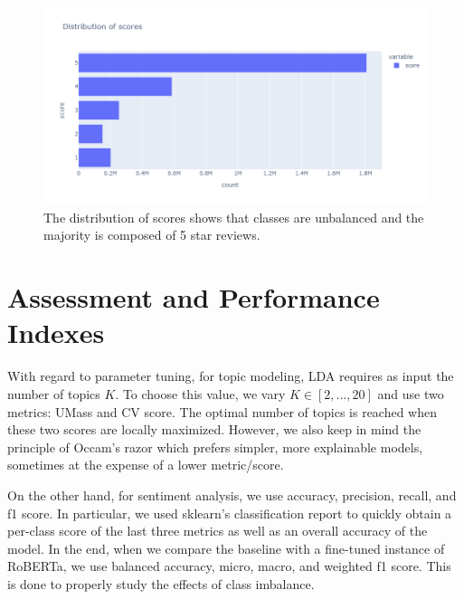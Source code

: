 \documentclass[a4paper,10pt, openright]{article}
\begin{document}
\begin{figure}[H]
	\begin{center}
		\includegraphics[width=18 cm, height=10 cm]{./Images/scores.png}
		\caption{The distribution of scores shows that classes are unbalanced and the majority is composed of 5 star reviews.}
		\label{fig:scores}
	\end{center}
\end{figure}

\section{Assessment and Performance Indexes }

With regard to parameter tuning, for topic modeling, LDA requires as input the number of topics $K$. To choose this value, we vary $K \in [2,...,20]$ and use two metrics: UMass and CV score\cite{firstbib}. The optimal number of topics is reached when these two scores are locally maximized. However, we also keep in mind the principle of Occam's razor which prefers simpler, more explainable models, sometimes at the expense of a lower metric/score. 

On the other hand, for sentiment analysis, we use accuracy, precision, recall, and f1 score. In particular, we used sklearn's classification report to quickly obtain a per-class score of the last three metrics as well as an overall accuracy of the model. In the end, when we compare the baseline with a fine-tuned instance of RoBERTa, we use balanced accuracy, micro, macro, and weighted f1 score. This is done to properly study the effects of class imbalance.
\end{document}
